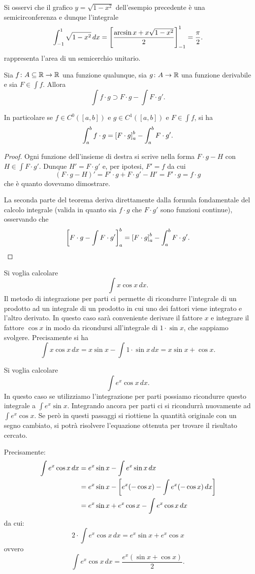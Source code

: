Si osservi che il grafico $y=\sqrt{1-x^2}$ dell'esempio precedente
è una semicirconferenza e dunque l'integrale 
\[
 \int_{-1}^1 \sqrt{1-x^2}\, dx = {\left[ \frac{\arcsin x +x\sqrt{1-x^2}}{2} \right]}_{-1}^{1}
 = \frac{\pi}{2}.
\]
rappresenta l'area di un semicerchio unitario.

\begin{theorem}
\mymark{*}%
%
Sia $f\colon A\subseteq {\mathbb R} \to {\mathbb R}$ una funzione qualunque, sia $g\colon A \to{\mathbb R}$
una funzione derivabile
e sia $F \in \int f$.
Allora
\[
  \int f\cdot g \supset F \cdot g - \int F \cdot g'.
\]

In particolare se $f\in C^0([a,b])$ e $g\in C^1([a,b])$
e $F \in \int f$, si ha
\[
  \int_a^b f\cdot g = {\left[ F\cdot g \right]}_a^b - \int_a^b F \cdot g'.
\]
\end{theorem}
%
\begin{proof}
\mymark{*}
Ogni funzione dell'insieme di destra si scrive nella forma
$F\cdot g - H$ con $H \in \int F \cdot g'$.
Dunque $H' = F \cdot g'$ e, per ipotesi, $F'=f$ da cui
\[
(F\cdot g - H)' = F' \cdot g + F \cdot g' - H' = F' \cdot g
= f\cdot g
\]
che è quanto dovevamo dimostrare.

La seconda parte del teorema
deriva direttamente dalla formula fondamentale del calcolo integrale
(valida in quanto sia $f\cdot g$ che $F \cdot g'$ sono funzioni continue),
osservando che
\[
{\left[ F\cdot g - \int F \cdot g' \right]}_a^b
= {\left[ F\cdot g \right]}_a^b - \int_a^b F \cdot g'.
\]
\end{proof}

\begin{example}
Si voglia calcolare
\[
  \int x \cos x\, dx.
\]
Il metodo di integrazione per parti ci permette
di ricondurre l'integrale di un prodotto ad un integrale
di un prodotto in cui uno dei fattori viene integrato e l'altro derivato.
In questo caso sarà conveniente derivare il fattore $x$
e integrare il fattore $\cos x$ in modo da ricondursi all'integrale di
$1\cdot \sin x$, che sappiamo svolgere.
Precisamente si ha
\[
 \int x \cos x\, dx = x \sin x - \int 1 \cdot \sin x \, dx
  = x \sin x + \cos x.
\]
\end{example}

\begin{example}
Si voglia calcolare
\[
 \int e^x \cos x\, dx.
\]
In questo caso se utilizziamo l'integrazione per parti possiamo ricondurre
questo integrale a $\int e^x \sin x$. Integrando ancora per parti ci si
ricondurrà nuovamente ad $\int e^x \cos x$. Se però in questi passaggi si
riottiene la quantità originale con un segno cambiato, si potrà risolvere
l'equazione ottenuta per trovare il risultato cercato.

Precisamente:
\begin{align*}
\int e^x \cos x\, dx
&= e^x \sin x - \int e^x \sin x\, dx\\
 &= e^x \sin x - {\left[ e^x(-\cos x) - \int e^x(-\cos x)\, dx \right]} \\
 &= e^x \sin x + e^x \cos x - \int e^x \cos x \, dx
\end{align*}
da cui:
\[
 2 \cdot \int e^x \cos x\, dx  = e^x \sin x + e^x \cos x
\]
ovvero
\[
  \int e^x \cos x\, dx = \frac{e^x(\sin x + \cos x)}{2}.
\]
\end{example}

